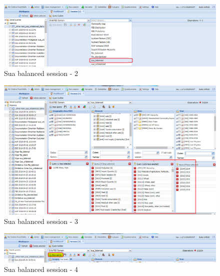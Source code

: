 \documentclass[]{article}
\begin{document}
\begin{figure}[H]

{\centering \includegraphics[width=1\linewidth]{images/standPlugin/15_newSession2b} 

}

\caption{\label{fig:f15}Sua balanced session - 2}\label{fig:f15}
\end{figure}

\begin{figure}[H]

{\centering \includegraphics[width=1\linewidth]{images/standPlugin/16_query} 

}

\caption{\label{fig:f16}Sua balanced session - 3}\label{fig:f16}
\end{figure}

\begin{figure}[H]

{\centering \includegraphics[width=1\linewidth]{images/standPlugin/17_run} 

}

\caption{\label{fig:f17}Sua balanced session - 4}\label{fig:f17}
\end{figure}
\end{document}
